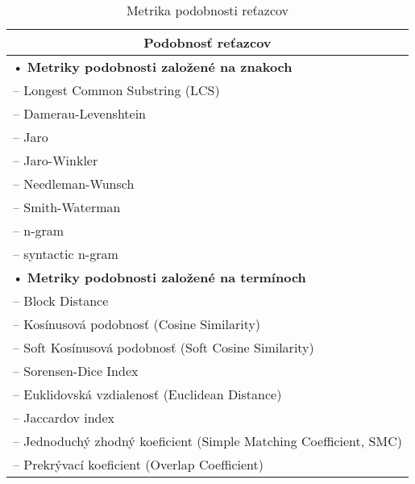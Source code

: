 \small
\begin{table}[H]
    \centering
    \renewcommand{\arraystretch}{1.2}
    \begin{tabular}{|l|}
        \hline
        \multicolumn{1}{|c|}{\textbf{Podobnosť reťazcov}} \\
        \hline
        • \textbf{Metriky podobnosti založené na znakoch} \\
        \quad – Longest Common Substring (LCS) \\
        \quad – Damerau-Levenshtein \\
        \quad – Jaro \\
        \quad – Jaro-Winkler \\
        \quad – Needleman-Wunsch \\
        \quad – Smith-Waterman \\
        \quad – n-gram \\
        \quad – syntactic n-gram \\
        • \textbf{Metriky podobnosti založené na termínoch} \\
        \quad – Block Distance \\
        \quad – Kosínusová podobnosť (Cosine Similarity) \\
        \quad – Soft Kosínusová podobnosť (Soft Cosine Similarity) \\
        \quad – Sorensen-Dice Index \\
        \quad – Euklidovská vzdialenosť (Euclidean Distance) \\
        \quad – Jaccardov index \\
        \quad – Jednoduchý zhodný koeficient (Simple Matching Coefficient, SMC) \\
        \quad – Prekrývací koeficient (Overlap Coefficient) \\
        \hline
    \end{tabular}
\caption{Metrika podobnosti reťazcov}
\label{kap:string_similarity}
\end{table}


